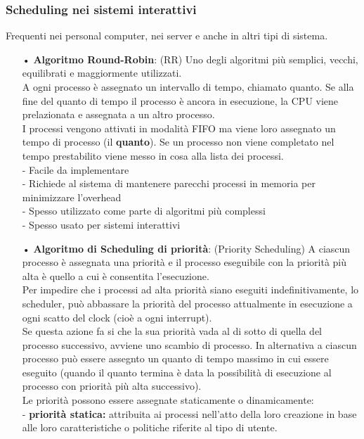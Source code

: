 \documentclass{article}
\begin{document}
\newpage
\subsubsection{Scheduling nei sistemi interattivi}
Frequenti nei personal computer, nei server e anche in altri tipi di sistema.
\\
\begin{enumerate}
   \item[•] \textbf{}\textbf{Algoritmo Round-Robin}: (RR) Uno degli algoritmi più semplici, vecchi, equilibrati e maggiormente utilizzati.
      \\A ogni processo è assegnato un intervallo di tempo, chiamato quanto. Se alla fine del quanto di tempo il processo è ancora in esecuzione, la CPU viene prelazionata e assegnata a un altro processo.
      \\I processi vengono attivati in modalità FIFO ma viene loro assegnato un tempo di processo (il \textbf{quanto}). Se un processo non viene completato nel tempo prestabilito viene messo in cosa alla lista dei processi.
      \\- Facile da implementare 
      \\- Richiede al sistema di mantenere parecchi processi in memoria per minimizzare l'overhead
      \\- Spesso utilizzato come parte di algoritmi più complessi
      \\- Spesso usato per sistemi interattivi 
   \item[•] \textbf{Algoritmo di Scheduling di priorità}: (Priority Scheduling) A ciascun processo è assegnata una priorità e il processo eseguibile con la priorità più alta è quello a cui è consentita l'esecuzione.
      \\Per impedire che i processi ad alta priorità siano eseguiti indefinitivamente, lo scheduler, può abbassare la priorità del processo attualmente in esecuzione a ogni scatto del clock (cioè a ogni interrupt).
      \\Se questa azione fa si che la sua priorità vada al di sotto di quella del processo successivo, avviene uno scambio di processo. In alternativa a ciascun processo può essere assegnto un quanto di tempo massimo in cui essere eseguito (quando il quanto termina è data la possibilità di esecuzione al processo con priorità più alta successivo).
      \\Le priorità possono essere assegnate staticamente o dinamicamente:
      \\- \textbf{priorità statica:} attribuita ai processi nell'atto della loro creazione in base alle loro caratteristiche o politiche riferite al tipo di utente.

\end{enumerate}
\end{document}
